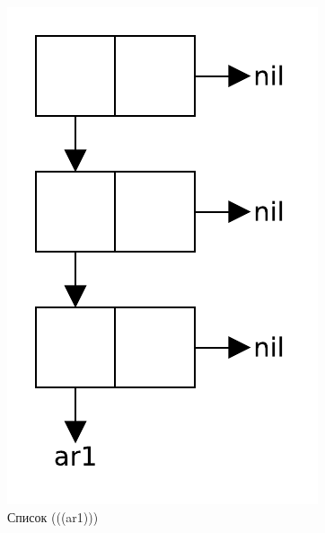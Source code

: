 \begin{figure}[H]
    \centering
    \includegraphics[scale=0.75]{data/pdf/02-03.pdf}
    \caption{Список (((ar1)))}
\end{figure}

